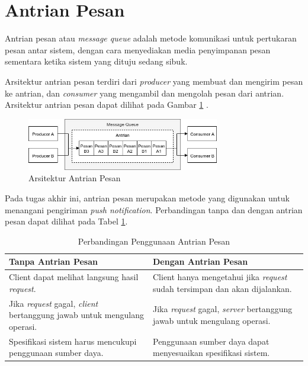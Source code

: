 \section{Antrian Pesan}
\par Antrian pesan atau \textit{message queue} adalah metode komunikasi untuk pertukaran pesan antar sistem, dengan cara menyediakan media penyimpanan pesan sementara ketika sistem yang dituju sedang sibuk.
\par Arsitektur antrian pesan terdiri dari \textit{producer} yang membuat dan mengirim pesan ke antrian, dan \textit{consumer} yang mengambil dan mengolah pesan dari antrian. Arsitektur antrian pesan dapat dilihat pada Gambar \ref{img:arsitektur-mq_pnt} \cite{message-queue-online}.
\begin{figure}[H]
	\centering\includegraphics[width=0.75\textwidth]{bab2/img/arsitektur-mq_pnt.jpg}
	\caption{Arsitektur Antrian Pesan}
	\label{img:arsitektur-mq_pnt}
\end{figure}
\par Pada tugas akhir ini, antrian pesan merupakan metode yang digunakan untuk menangani pengiriman \textit{push notification}. Perbandingan tanpa dan dengan antrian pesan dapat dilihat pada Tabel \ref{t:perbandingan-antrian-pesan}.
\begin{longtable}{|p{4.5cm}|p{4.5cm}|}
	\caption{Perbandingan Penggunaan Antrian Pesan} \label{t:perbandingan-antrian-pesan} \\ \hline
	\rowcolor{lightgray} Tanpa Antrian Pesan & Dengan Antrian Pesan \\ \hline
	\endhead
	Client dapat melihat langsung hasil \textit{request}. & Client hanya mengetahui jika \textit{request} sudah tersimpan dan akan dijalankan. \\ \hline
	Jika \textit{request} gagal, \textit{client} bertanggung jawab untuk mengulang operasi. & Jika \textit{request} gagal, \textit{server} bertanggung jawab untuk mengulang operasi. \\ \hline
	Spesifikasi sistem harus mencukupi penggunaan sumber daya. & Penggunaan sumber daya dapat menyesuaikan spesifikasi sistem. \\ \hline
\end{longtable}

